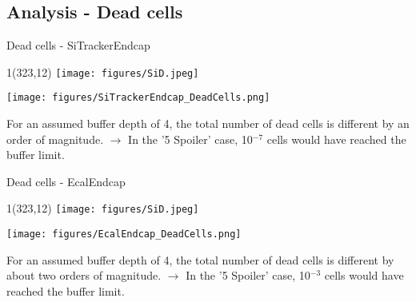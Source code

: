 \documentclass[xcolor={dvipsnames}]{beamer}
\newcommand{\sidlogo}{
  \setlength{\TPHorizModule}{1pt}
  \setlength{\TPVertModule}{1pt}
  \begin{textblock}{1}(323,12)
   \texttt{[image: figures/SiD.jpeg]}
  \end{textblock}
  }
\begin{document}
\subsection{Analysis - Dead cells}
\begin{frame}{Dead cells - \small SiTrackerEndcap}
\sidlogo
 \begin{center}
\texttt{[image: figures/SiTrackerEndcap\_DeadCells.png]}
\end{center}
\small For an assumed buffer depth of 4, the total number of dead cells is different by an order of magnitude. $\rightarrow$ In the '5 Spoiler' case, 10$^{-7}$ cells would have reached the buffer limit.
\end{frame}
\begin{frame}{Dead cells - \small EcalEndcap}
\sidlogo
 \begin{center}
\texttt{[image: figures/EcalEndcap\_DeadCells.png]}
\end{center}
\small For an assumed buffer depth of 4, the total number of dead cells is different by about two orders of magnitude. $\rightarrow$ In the '5 Spoiler' case, 10$^{-3}$ cells would have reached the buffer limit.
\end{frame}
\end{document}
